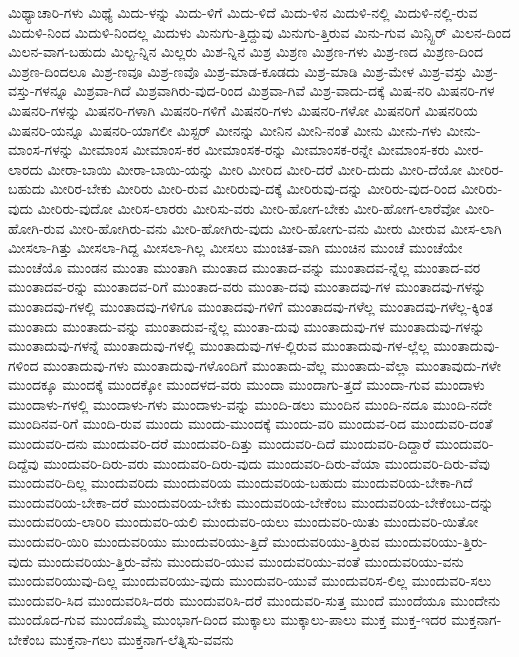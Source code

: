 {ಮಿಥ್ಯಾಚಾರಿ-ಗಳು
ಮಿಥ್ಯೆ
ಮಿದು-ಳನ್ನು
ಮಿದು-ಳಿಗೆ
ಮಿದು-ಳಿದೆ
ಮಿದು-ಳಿನ
ಮಿದುಳಿ-ನಲ್ಲಿ
ಮಿದುಳಿ-ನಲ್ಲಿ-ರುವ
ಮಿದುಳಿ-ನಿಂದ
ಮಿದುಳಿ-ನಿಂದಲ್ಲ
ಮಿದುಳು
ಮಿನುಗು-ತ್ತಿದ್ದುವು
ಮಿನುಗು-ತ್ತಿರುವ
ಮಿನು-ಗುವ
ಮಿನ್ಸ್ಟಿರ್
ಮಿಲನ-ದಿಂದ
ಮಿಲನ-ವಾಗ-ಬಹುದು
ಮಿಲ್ಟ-ನ್ನಿನ
ಮಿಲ್ಲರು
ಮಿಶ-ನ್ನಿನ
ಮಿಶ್ರ
ಮಿಶ್ರಣ
ಮಿಶ್ರಣ-ಗಳು
ಮಿಶ್ರ-ಣದ
ಮಿಶ್ರಣ-ದಿಂದ
ಮಿಶ್ರಣ-ದಿಂದಲೂ
ಮಿಶ್ರ-ಣವೂ
ಮಿಶ್ರ-ಣವೊ
ಮಿಶ್ರ-ಮಾಡ-ಕೂಡದು
ಮಿಶ್ರ-ಮಾಡಿ
ಮಿಶ್ರ-ಮೇಳ
ಮಿಶ್ರ-ವಸ್ತು
ಮಿಶ್ರ-ವಸ್ತು-ಗಳನ್ನೂ
ಮಿಶ್ರವಾ-ಗಿದೆ
ಮಿಶ್ರವಾಗಿರು-ವುದ-ರಿಂದ
ಮಿಶ್ರವಾ-ಗಿವೆ
ಮಿಶ್ರ-ವಾದು-ದಕ್ಕೆ
ಮಿಷ-ನರಿ
ಮಿಷನರಿ-ಗಳ
ಮಿಷನರಿ-ಗಳನ್ನು
ಮಿಷನರಿ-ಗಳಾಗಿ
ಮಿಷನರಿ-ಗಳಿಗೆ
ಮಿಷನರಿ-ಗಳು
ಮಿಷನರಿ-ಗಳೋ
ಮಿಷನರಿಗೆ
ಮಿಷನರಿಯ
ಮಿಷನರಿ-ಯನ್ನೂ
ಮಿಷನರಿ-ಯಾಗಲೀ
ಮಿಸ್ಟರ್
ಮೀನನ್ನು
ಮೀನಿನ
ಮೀನಿ-ನಂತೆ
ಮೀನು
ಮೀನು-ಗಳು
ಮೀನು-ಮಾಂಸ-ಗಳನ್ನು
ಮೀಮಾಂಸ
ಮೀಮಾಂಸ-ಕರ
ಮೀಮಾಂಸಕ-ರನ್ನು
ಮೀಮಾಂಸಕ-ರನ್ನೇ
ಮೀಮಾಂಸ-ಕರು
ಮೀರ-ಲಾರದು
ಮೀರಾ-ಬಾಯಿ
ಮೀರಾ-ಬಾಯಿ-ಯನ್ನು
ಮೀರಿ
ಮೀರಿದ
ಮೀರಿ-ದರೆ
ಮೀರಿ-ದುದು
ಮೀರಿ-ದೆಯೋ
ಮೀರಿರ-ಬಹುದು
ಮೀರಿರ-ಬೇಕು
ಮೀರಿರು
ಮೀರಿ-ರುವ
ಮೀರಿರುವು-ದಕ್ಕೆ
ಮೀರಿರುವು-ದನ್ನು
ಮೀರಿರು-ವುದ-ರಿಂದ
ಮೀರಿರು-ವುದು
ಮೀರಿರು-ವುದೋ
ಮೀರಿಸ-ಲಾರರು
ಮೀರಿಸು-ವರು
ಮೀರಿ-ಹೋಗ-ಬೇಕು
ಮೀರಿ-ಹೋಗ-ಲಾರೆವೋ
ಮೀರಿ-ಹೋಗಿ-ರುವ
ಮೀರಿ-ಹೋಗಿರು-ವನು
ಮೀರಿ-ಹೋಗಿರು-ವುದು
ಮೀರಿ-ಹೋಗು-ವನು
ಮೀರು
ಮೀರುವ
ಮೀಸ-ಲಾಗಿ
ಮೀಸಲಾ-ಗಿತ್ತು
ಮೀಸಲಾ-ಗಿದ್ದ
ಮೀಸಲಾ-ಗಿಲ್ಲ
ಮೀಸಲು
ಮುಂಚಿತ-ವಾಗಿ
ಮುಂಚಿನ
ಮುಂಚೆ
ಮುಂಚೆಯೇ
ಮುಂಚೆಯೊ
ಮುಂಡನ
ಮುಂತಾ
ಮುಂತಾಗಿ
ಮುಂತಾದ
ಮುಂತಾದ-ವನ್ನು
ಮುಂತಾದವ-ನ್ನೆಲ್ಲ
ಮುಂತಾದ-ವರ
ಮುಂತಾದವ-ರನ್ನು
ಮುಂತಾದವ-ರಿಗೆ
ಮುಂತಾದ-ವರು
ಮುಂತಾ-ದವು
ಮುಂತಾದವು-ಗಳ
ಮುಂತಾದವು-ಗಳನ್ನು
ಮುಂತಾದವು-ಗಳಲ್ಲಿ
ಮುಂತಾದವು-ಗಳಿಗೂ
ಮುಂತಾದವು-ಗಳಿಗೆ
ಮುಂತಾದವು-ಗಳೆಲ್ಲ
ಮುಂತಾದವು-ಗಳೆಲ್ಲ-ಕ್ಕಿಂತ
ಮುಂತಾದು
ಮುಂತಾದು-ವನ್ನು
ಮುಂತಾದುವ-ನ್ನೆಲ್ಲ
ಮುಂತಾ-ದುವು
ಮುಂತಾದುವು-ಗಳ
ಮುಂತಾದುವು-ಗಳನ್ನು
ಮುಂತಾದುವು-ಗಳನ್ನೆ
ಮುಂತಾದುವು-ಗಳಲ್ಲಿ
ಮುಂತಾದುವು-ಗಳ-ಲ್ಲಿರುವ
ಮುಂತಾದುವು-ಗಳ-ಲ್ಲೆಲ್ಲ
ಮುಂತಾದುವು-ಗಳಿಂದ
ಮುಂತಾದುವು-ಗಳು
ಮುಂತಾದುವು-ಗಳೊಂದಿಗೆ
ಮುಂತಾದು-ವೆಲ್ಲ
ಮುಂತಾದು-ವೆಲ್ಲಾ
ಮುಂತಾವುದು-ಗಳೇ
ಮುಂದಕ್ಕೂ
ಮುಂದಕ್ಕೆ
ಮುಂದಕ್ಕೋ
ಮುಂದಳದ-ವರು
ಮುಂದಾ
ಮುಂದಾಗು-ತ್ತದೆ
ಮುಂದಾ-ಗುವ
ಮುಂದಾಳು
ಮುಂದಾಳು-ಗಳಲ್ಲಿ
ಮುಂದಾಳು-ಗಳು
ಮುಂದಾಳು-ವನ್ನು
ಮುಂದಿ-ಡಲು
ಮುಂದಿನ
ಮುಂದಿ-ನದೂ
ಮುಂದಿ-ನದೇ
ಮುಂದಿನವ-ರಿಗೆ
ಮುಂದಿ-ರುವ
ಮುಂದು
ಮುಂದು-ಮುಂದಕ್ಕೆ
ಮುಂದು-ವರಿ
ಮುಂದುವ-ರಿದ
ಮುಂದುವರಿ-ದಂತೆ
ಮುಂದುವರಿ-ದನು
ಮುಂದುವರಿ-ದರೆ
ಮುಂದುವರಿ-ದಿತ್ತು
ಮುಂದುವರಿ-ದಿದೆ
ಮುಂದುವರಿ-ದಿದ್ದಾರೆ
ಮುಂದುವರಿ-ದಿದ್ದೆವು
ಮುಂದುವರಿ-ದಿರು-ವರು
ಮುಂದುವರಿ-ದಿರು-ವುದು
ಮುಂದುವರಿ-ದಿರು-ವೆಯಾ
ಮುಂದುವರಿ-ದಿರು-ವೆವು
ಮುಂದುವರಿ-ದಿಲ್ಲ
ಮುಂದುವರಿದು
ಮುಂದುವರಿಯ
ಮುಂದುವರಿಯ-ಬಹುದು
ಮುಂದುವರಿಯ-ಬೇಕಾ-ಗಿದೆ
ಮುಂದುವರಿಯ-ಬೇಕಾ-ದರೆ
ಮುಂದುವರಿಯ-ಬೇಕು
ಮುಂದುವರಿಯ-ಬೇಕೆಂಬ
ಮುಂದುವರಿಯ-ಬೇಕೆಂಬು-ದನ್ನು
ಮುಂದುವರಿಯ-ಲಾರಿರಿ
ಮುಂದುವರಿ-ಯಲಿ
ಮುಂದುವರಿ-ಯಲು
ಮುಂದುವರಿ-ಯಿತು
ಮುಂದುವರಿ-ಯಿತೋ
ಮುಂದುವರಿ-ಯಿರಿ
ಮುಂದುವರಿಯು
ಮುಂದುವರಿಯು-ತ್ತಿದೆ
ಮುಂದುವರಿಯು-ತ್ತಿರುವ
ಮುಂದುವರಿಯು-ತ್ತಿರು-ವುದು
ಮುಂದುವರಿಯು-ತ್ತಿರು-ವೆನು
ಮುಂದುವರಿ-ಯುವ
ಮುಂದುವರಿಯು-ವಂತೆ
ಮುಂದುವರಿಯು-ವನು
ಮುಂದುವರಿಯುವು-ದಿಲ್ಲ
ಮುಂದುವರಿಯು-ವುದು
ಮುಂದುವರಿ-ಯುವೆ
ಮುಂದುವರಿಸ-ಲಿಲ್ಲ
ಮುಂದುವರಿ-ಸಲು
ಮುಂದುವರಿ-ಸಿದ
ಮುಂದುವರಿಸಿ-ದರು
ಮುಂದುವರಿಸಿ-ದರೆ
ಮುಂದುವರಿ-ಸುತ್ತ
ಮುಂದೆ
ಮುಂದೆಯೂ
ಮುಂದೇನು
ಮುಂದೊದ-ಗುವ
ಮುಂದೊಮ್ಮೆ
ಮುಂಭಾಗ-ದಿಂದ
ಮುಕ್ಕಾಲು
ಮುಕ್ಕಾಲು-ಪಾಲು
ಮುಕ್ತ
ಮುಕ್ತ-ಇದರ
ಮುಕ್ತನಾಗ-ಬೇಕೆಂಬ
ಮುಕ್ತನಾ-ಗಲು
ಮುಕ್ತನಾಗ-ಲೆತ್ನಿಸು-ವವನು
}
